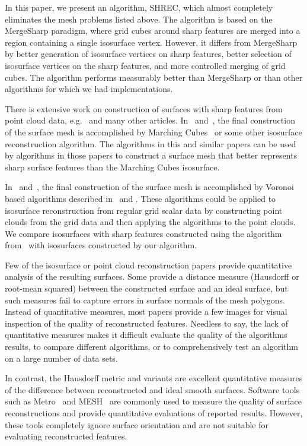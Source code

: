 In this paper, we present an algorithm, SHREC,
which almost completely eliminates the mesh problems listed above.
The algorithm is based on the MergeSharp paradigm,
where grid cubes around sharp features are merged
into a region containing a single isosurface vertex.
However, it differs from MergeSharp by better generation
of isosurface vertices on sharp features,
better selection of isosurface vertices on the sharp features,
and more controlled merging of grid cubes.
The algorithm performs measurably better
than MergeSharp or than other algorithms for which we had implementations.

There is extensive work on construction of surfaces with sharp features 
from point cloud data,
e.g.~\cite{avron2010L,cdr-drpsc-07,Daniels:2007:Robust,Dey2012,
fcs-rmlsf-2005,Oztireli2009,sym-fpmg-10,Wang:2013:Feature}
and many other articles.
In~\cite{Oztireli2009} and~\cite{Wang:2013:Feature},
the final construction of the surface mesh is accomplished 
by Marching Cubes~\cite{lc-mchr3-87}
or some other isosurface reconstruction algorithm.
The algorithms in this and similar papers
can be used by algorithms in those papers
to construct a surface mesh that better represents sharp surface features
than the Marching Cubes isosurface.

In~\cite{cdr-drpsc-07,Dey2012} and~\cite{sym-fpmg-10},
the final construction of the surface mesh is accomplished
by Voronoi based algorithms described 
in~\cite{cdr-drpsc-07} and \cite{Dey2012}.
These algorithms could be applied to isosurface reconstruction
from regular grid scalar data
by constructing point clouds from the grid data
and then applying the algorithms to the point clouds.
We compare isosurfaces with sharp features constructed
using the algorithm from~\cite{Dey2012}
with isosurfaces constructed by our algorithm.

Few of the isosurface or point cloud reconstruction papers
provide quantitative analysis of the resulting surfaces.
Some provide a distance measure (Hausdorff or root-mean squared)
between the constructed surface and an ideal surface,
but such measures fail to capture errors in surface normals
of the mesh polygons.
Instead of quantitative measures,
most papers provide a few images for visual inspection
of the quality of reconstructed features.
Needless to say, the lack of quantitative measures makes it
difficult evaluate the quality of the algorithms results,
to compare different algorithms,
or to comprehensively test an algorithm on a large number of data sets.

In contrast, the Hausdorff metric and variants are excellent
quantitative measures of the difference between reconstructed
and ideal smooth surfaces.
Software tools such as Metro~\cite{Cignoni:1998:metro} 
and MESH~\cite{Aspert:2002:MESH} are commonly used to measure
the quality of surface reconstructions
and provide quantitative evaluations of reported results.
However, these tools completely ignore surface orientation
and are not suitable for evaluating reconstructed features.

